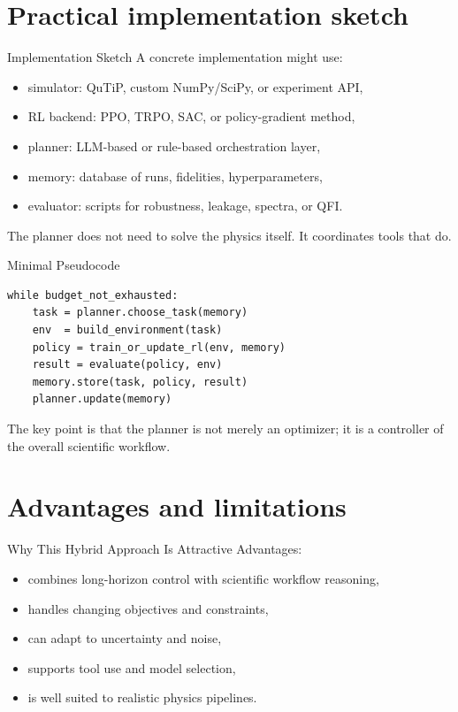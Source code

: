 \documentclass[aspectratio=169]{beamer}
\begin{document}
\section{Practical implementation sketch}

\begin{frame}{Implementation Sketch}
A concrete implementation might use:
\begin{itemize}
    \item simulator: QuTiP, custom NumPy/SciPy, or experiment API,
    \item RL backend: PPO, TRPO, SAC, or policy-gradient method,
    \item planner: LLM-based or rule-based orchestration layer,
    \item memory: database of runs, fidelities, hyperparameters,
    \item evaluator: scripts for robustness, leakage, spectra, or QFI.
\end{itemize}

The planner does not need to solve the physics itself. It coordinates tools that do.
\end{frame}

\begin{frame}[fragile]{Minimal Pseudocode}
\begin{verbatim}
while budget_not_exhausted:
    task = planner.choose_task(memory)
    env  = build_environment(task)
    policy = train_or_update_rl(env, memory)
    result = evaluate(policy, env)
    memory.store(task, policy, result)
    planner.update(memory)
\end{verbatim}

The key point is that the planner is not merely an optimizer; it is a controller of the overall scientific workflow.
\end{frame}

\section{Advantages and limitations}

\begin{frame}{Why This Hybrid Approach Is Attractive}
Advantages:
\begin{itemize}
    \item combines long-horizon control with scientific workflow reasoning,
    \item handles changing objectives and constraints,
    \item can adapt to uncertainty and noise,
    \item supports tool use and model selection,
    \item is well suited to realistic physics pipelines.
\end{itemize}
\end{frame}
\end{document}
